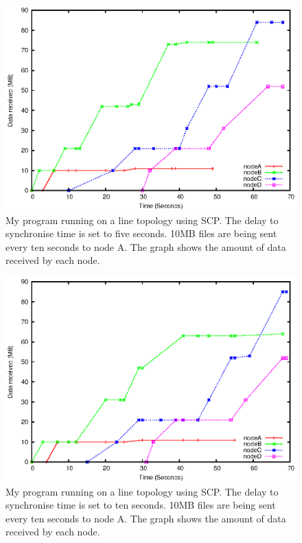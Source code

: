 \documentclass[12pt]{article}
\begin{document}
\begin{figure}[ht!]
\centering
\includegraphics[height=0.38\textheight]{images/line-scp-10-5.eps}
\caption{My program running on a line topology using SCP.
The delay to synchronise time is set to five seconds.
10MB files are being sent every ten seconds to node A. The graph
shows the amount of data received by each node.}
\label{fig:line_scp_10_5}
\end{figure}

\begin{figure}[hb!]
\centering
\includegraphics[height=0.38\textheight]{images/line-scp-10-10.eps}
\caption{My program running on a line topology using SCP.
The delay to synchronise time is set to ten seconds.
10MB files are being sent every ten seconds to node A. The graph
shows the amount of data received by each node.}
\label{fig:line_scp_10_10}
\end{figure}
\end{document}
